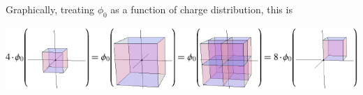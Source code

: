 \documentclass{esg8022pset}
\begin{document}
\begin{solution}
  Graphically, treating $\phi_0$ as a function of charge distribution, this is
  \begin{center}\includegraphics[width=\textwidth]{ps02_sol_07}\end{center}
\end{solution}
\end{document}
